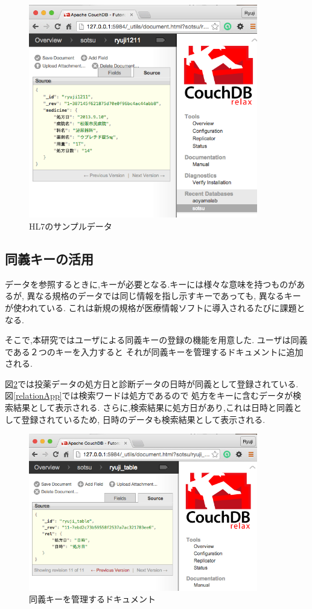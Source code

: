 			\begin{figure}[htbp]
				\begin{center}
					\includegraphics[width=10cm, bb=0 0 576 573]{./gazou/hl7-data.png}
				\end{center}
				\caption{HL7のサンプルデータ}
				\label{hl7-data}
			\end{figure}



\subsection{同義キーの活用}
	データを参照するときに,キーが必要となる.キーには様々な意味を持つものがあるが,
	異なる規格のデータでは同じ情報を指し示すキーであっても,
	異なるキーが使われている.
	これは新規の規格が医療情報ソフトに導入されるたびに課題となる.

	そこで,本研究ではユーザによる同義キーの登録の機能を用意した.
	ユーザは同義である２つのキーを入力すると
	それが同義キーを管理するドキュメントに追加される.

	図\ref{relation}では投薬データの処方日と診断データの日時が同義として登録されている.
	図\ref{relationApp}では検索ワードは処方であるので
	処方をキーに含むデータが検索結果として表示される.
	さらに,検索結果に処方日があり,これは日時と同義として登録されているため,
	日時のデータも検索結果として表示される.

	\begin{figure}[htbp]
		\begin{center}
			\includegraphics[width=10cm, bb=0 0 609 478, clip]{./gazou/relation2.png}
		\end{center}
		\caption{同義キーを管理するドキュメント}
		\label{relation}
	\end{figure}

